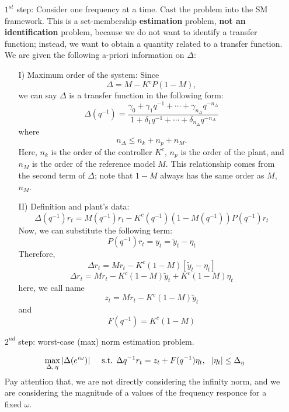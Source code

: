 \begin{enumerate}
\item[$1^{st}$ step:] Consider one frequency at a time. Cast the problem into the SM framework. This is a set-membership \textbf{estimation} problem, \textbf{not an identification} problem, because we do not want to identify a transfer function; instead, we want to obtain a quantity related to a transfer function. We are given the following a-priori information on \(\Delta\):

\begin{itemize}
    \item[I)] Maximum order of the system: Since 
    \[
    \Delta = M - K^cP(1-M),
    \]
    we can say \(\Delta\) is a transfer function in the following form:
    \[
    \Delta(q^{-1}) = \frac{\gamma_0 + \gamma_1 q^{-1} + \cdots + \gamma_{n_\Delta}q^{-n_{\Delta}}}{1 + \delta_1 q^{-1} + \cdots + \delta_{n_\Delta}q^{-n_{\Delta}}}
    \]
    where
    \[
    n_\Delta \leq n_k + n_p + n_M.
    \]
    Here, \(n_k\) is the order of the controller \(K^c\), \(n_p\) is the order of the plant, and \(n_M\) is the order of the reference model \(M\). This relationship comes from the second term of \(\Delta\); note that \(1-M\) always has the same order as \(M\), \(n_M\).

    \item[II)] Definition and plant's data:
    \[
    \Delta(q^{-1})r_t = M(q^{-1})r_t - K^c(q^{-1})(1-M(q^{-1}))P(q^{-1})r_t 
    \]
    Now, we can substitute the following term:
    \[
    P(q^{-1})r_t = y_t = \tilde{y}_t - \eta_t
    \]
    Therefore,
       \[
    \Delta r_t = Mr_t - K^c(1-M)\left[ \tilde{y}_t - \eta_t \right]
    \]
    \[
    \Delta r_t = Mr_t - K^c(1-M)\tilde{y}_t + K^c (1-M)\eta_t
    \]
    here, we call name
    \[
    z_t = Mr_t - K^c(1-M)\tilde{y}_t
    \]
    and
    \[
    F(q^{-1}) = K^c (1-M)
    \]
    
    
\end{itemize}
    \item[$2^{nd}$ step:]  worst-case (max) norm estimation problem.
    
        \[
        \max_{\Delta,\,\eta} |\Delta(e^{i\omega})| \hspace{0.5cm} \text{s.t. } \Delta{q^{-1}}r_t = z_t + F(q^{-1})\eta_t,\,\,\,\,|\eta_t|\leq \Delta_\eta
        \]
        Pay attention that, we are not directly considering the infinity norm, and we are considering the magnitude of a values of the frequency responce for a fixed $\omega$.
        

\end{enumerate}
